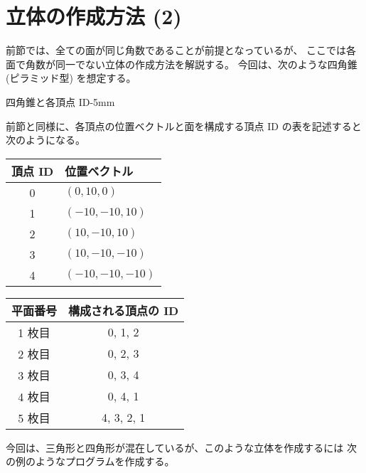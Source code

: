 \section{立体の作成方法 (2)} \label{subsec:solidGen2}
前節では、全ての面が同じ角数であることが前提となっているが、
ここでは各面で角数が同一でない立体の作成方法を解説する。
今回は、次のような四角錐 (ピラミッド型) を想定する。

	{四角錐と各頂点 ID}{-5mm}

前節と同様に、各頂点の位置ベクトルと面を構成する頂点 ID の表を記述すると
次のようになる。
\begin{center}
\begin{tabular}{|c|l|}
\hline
頂点 ID & 位置ベクトル \\ \hline
0 & \((0, 10, 0)\) \\ \hline
1 & \((-10, -10, 10)\) \\ \hline
2 & \((10, -10, 10)\) \\ \hline
3 & \((10, -10, -10)\) \\ \hline
4 & \((-10, -10, -10)\) \\ \hline
\end{tabular} \qquad
\begin{tabular}{|c|c|}
\hline
平面番号 & 構成される頂点の ID \\ \hline
1 枚目 & 0, 1, 2 \\ \hline
2 枚目 & 0, 2, 3 \\ \hline
3 枚目 & 0, 3, 4 \\ \hline
4 枚目 & 0, 4, 1 \\ \hline
5 枚目 & 4, 3, 2, 1 \\ \hline
\end{tabular}
\end{center}
今回は、三角形と四角形が混在しているが、このような立体を作成するには
次の例のようなプログラムを作成する。
\\
